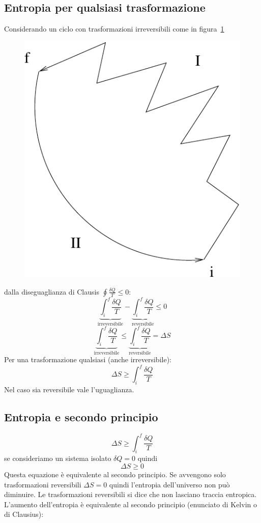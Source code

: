 \subsection{Entropia per qualsiasi trasformazione}
Considerando un ciclo con trasformazioni irreversibili come in figura~\ref{fig:ciclo_misto}
\begin{figure}[!htbp]
   \centering
   \includegraphics[scale=0.5]{immagini/fisica1/ciclo_misto}
   \label{fig:ciclo_misto}
\end{figure}
dalla diseguaglianza di Clausis $\oint\frac{\delta Q}{T}\leq 0$:
\[\underbrace{\int_i^f\frac{\delta Q}{T}}_\text{irreversibile}-\underbrace{\int_i^f\frac{\delta Q}{T}}_\text{reversibile}\leq 0\]
\[\underbrace{\int_i^f\frac{\delta Q}{T}}_\text{irreversibile}\leq\underbrace{\int_i^f\frac{\delta Q}{T}}_\text{reversibile}=\Delta S\]
Per una trasformazione qualsiasi (anche irreversibile):
\[\Delta S\geq\int_i^f\frac{\delta Q}{T}\]
Nel caso sia reversibile vale l'uguaglianza.

\subsection{Entropia e secondo principio}
\[\Delta S\geq\int_i^f\frac{\delta Q}{T}\]
se consideriamo un sistema isolato $\delta Q=0$ quindi
\begin{equation}
   \Delta S\geq 0
\end{equation}
Questa equazione è equivalente al secondo principio. Se avvengono solo trasformazioni reversibili $\Delta S=0$ quindi l'entropia dell'universo non può diminuire. Le trasformazioni reversibili si dice che non lasciano traccia entropica. L'aumento dell'entropia è equivalente al secondo principio (enunciato di Kelvin o di Clausius):
